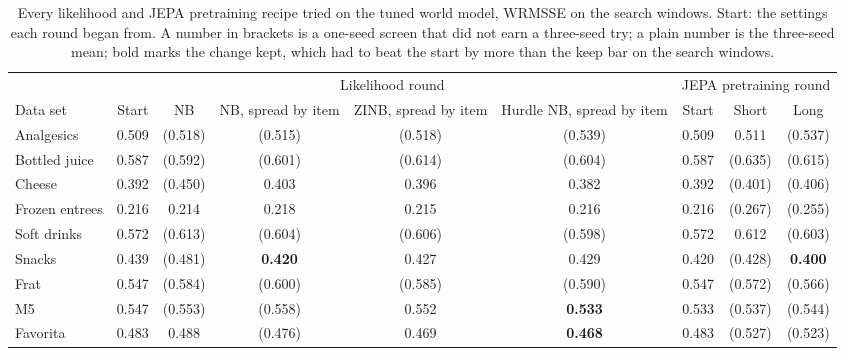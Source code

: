 \begin{table}[t]
\centering\footnotesize\setlength{\tabcolsep}{4pt}
\caption{Every likelihood and JEPA pretraining recipe tried on the tuned world model, WRMSSE on the search windows.
Start: the settings each round began from.
A number in brackets is a one-seed screen that did not earn a three-seed try; a plain number is the three-seed mean;
bold marks the change kept, which had to beat the start by more than the keep bar on the search windows.}
\label{tab:sup-explore}
\begin{adjustbox}{max width=\textwidth}\begin{tabular}{l ccccc ccc}
\toprule
 & \multicolumn{5}{c}{Likelihood round} & \multicolumn{3}{c}{JEPA pretraining round}\\
\cmidrule(lr){2-6}\cmidrule(lr){7-9}
Data set & Start & NB & NB, spread by item & ZINB, spread by item & Hurdle NB, spread by item & Start & Short & Long\\
\midrule
Analgesics & 0.509 & (0.518) & (0.515) & (0.518) & (0.539) & 0.509 & 0.511 & (0.537) \\
Bottled juice & 0.587 & (0.592) & (0.601) & (0.614) & (0.604) & 0.587 & (0.635) & (0.615) \\
Cheese & 0.392 & (0.450) & 0.403 & 0.396 & 0.382 & 0.392 & (0.401) & (0.406) \\
Frozen entrees & 0.216 & 0.214 & 0.218 & 0.215 & 0.216 & 0.216 & (0.267) & (0.255) \\
Soft drinks & 0.572 & (0.613) & (0.604) & (0.606) & (0.598) & 0.572 & 0.612 & (0.603) \\
Snacks & 0.439 & (0.481) & \textbf{0.420} & 0.427 & 0.429 & 0.420 & (0.428) & \textbf{0.400} \\
Frat & 0.547 & (0.584) & (0.600) & (0.585) & (0.590) & 0.547 & (0.572) & (0.566) \\
M5 & 0.547 & (0.553) & (0.558) & 0.552 & \textbf{0.533} & 0.533 & (0.537) & (0.544) \\
Favorita & 0.483 & 0.488 & (0.476) & 0.469 & \textbf{0.468} & 0.483 & (0.527) & (0.523) \\
\bottomrule
\end{tabular}\end{adjustbox}
\end{table}
